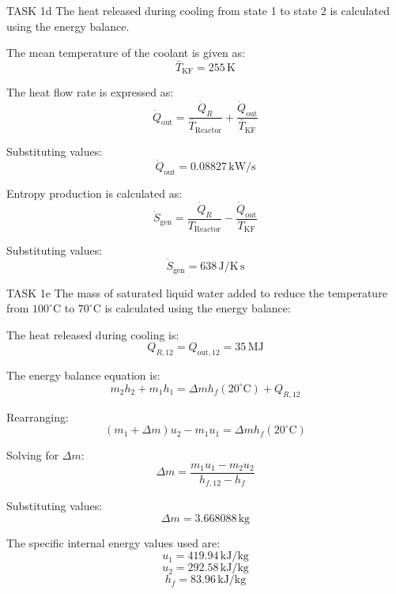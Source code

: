 TASK 1d  
The heat released during cooling from state 1 to state 2 is calculated using the energy balance.  

The mean temperature of the coolant is given as:  
\[
\bar{T}_{\text{KF}} = 255 \, \text{K}
\]

The heat flow rate is expressed as:  
\[
\dot{Q}_{\text{out}} = \frac{\dot{Q}_R}{\bar{T}_{\text{Reactor}}} + \frac{\dot{Q}_{\text{out}}}{\bar{T}_{\text{KF}}}
\]

Substituting values:  
\[
\dot{Q}_{\text{out}} = 0.08827 \, \text{kW/s}
\]

Entropy production is calculated as:  
\[
\dot{S}_{\text{gen}} = \frac{\dot{Q}_R}{T_{\text{Reactor}}} - \frac{\dot{Q}_{\text{out}}}{T_{\text{KF}}}
\]

Substituting values:  
\[
\dot{S}_{\text{gen}} = 638 \, \text{J/K} \, \text{s}
\]

TASK 1e  
The mass of saturated liquid water added to reduce the temperature from \(100^\circ\text{C}\) to \(70^\circ\text{C}\) is calculated using the energy balance:  

The heat released during cooling is:  
\[
Q_{R,12} = Q_{\text{out},12} = 35 \, \text{MJ}
\]

The energy balance equation is:  
\[
m_2 h_2 + m_1 h_1 = \Delta m h_f(20^\circ\text{C}) + Q_{R,12}
\]

Rearranging:  
\[
(m_1 + \Delta m) u_2 - m_1 u_1 = \Delta m h_f(20^\circ\text{C})
\]

Solving for \( \Delta m \):  
\[
\Delta m = \frac{m_1 u_1 - m_2 u_2}{h_{f,12} - h_f}
\]

Substituting values:  
\[
\Delta m = 3.668088 \, \text{kg}
\]

The specific internal energy values used are:  
\[
u_1 = 419.94 \, \text{kJ/kg}
\]
\[
u_2 = 292.58 \, \text{kJ/kg}
\]
\[
h_f = 83.96 \, \text{kJ/kg}
\]